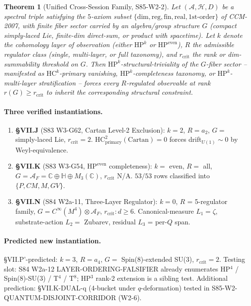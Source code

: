 \documentclass{article}
\newtheorem{theorem}{Theorem}
\begin{document}
\begin{theorem}[Unified Cross-Session Family, S85-W2-2]
Let $(\mathcal{A}, \mathcal{H}, D)$ be a spectral triple satisfying the $5$-axiom
subset $\{\text{dim}, \text{reg}, \text{fin}, \text{real}, \text{1st-order}\}$ of
CCM-2007, with finite fiber sector carried by an algebra/group structure $G$
(compact simply-laced Lie, finite-dim direct-sum, or product with spacetime).
Let $k$ denote the cohomology layer of observation (either $\mathrm{HP}^k$ or
$\mathrm{HP}^{\text{even}}$), $R$ the admissible regulator class (single,
multi-layer, or full taxonomy), and $r_{\text{crit}}$ the rank or
dim-summability threshold on $G$.
Then $\mathrm{HP}^k$-structural-triviality of the $G$-fiber sector --
manifested as $\mathrm{HC}^k$-primary vanishing, $\mathrm{HP}^k$-completeness
taxonomy, or $\mathrm{HP}^k$-multi-layer stratification -- forces every
$R$-regulated observable at rank $r(G) \geq r_{\text{crit}}$ to inherit the
corresponding structural constraint.
\end{theorem}

\paragraph{Three verified instantiations.}
\begin{enumerate}
\item \textbf{\S VII.J} (S83 W3-G62, Cartan Level-2 Exclusion):
      $k=2$, $R = a_2$, $G = $ simply-laced Lie, $r_{\text{crit}}=2$.
      $\mathrm{HC}^2_{\text{primary}}(\text{Cartan}) = 0$ forces
      drift$_{U(1)} \sim 0$ by Weyl-equivalence.
\item \textbf{\S VII.K} (S83 W3-G54, $\mathrm{HP}^{\text{even}}$ completeness):
      $k = $ even, $R = $ all, $G = \mathcal{A}_F = \mathbb{C} \oplus \mathbb{H}
      \oplus M_3(\mathbb{C})$, $r_{\text{crit}}$ N/A.
      $53/53$ rows classified into $\{P, CM, M, GV\}$.
\item \textbf{\S VII.N} (S84 W2a-11, Three-Layer Regulator):
      $k = 0$, $R$ = 5-regulator family, $G = C^\infty(M^4) \otimes
      \mathcal{A}_F$, $r_{\text{crit}}: d \geq 6$.
      Canonical-measure $L_1 = \zeta$, substrate-action $L_2 = $ Zubarev,
      residual $L_3$ = per-$Q$ span.
\end{enumerate}

\paragraph{Predicted new instantiation.}
\S VII.P'-predicted: $k=3$, $R = a_4$, $G = $ Spin(8)-extended SU(3),
$r_{\text{crit}} = 2$.  Testing slot: S84 W2a-12 LAYER-ORDERING-FALSIFIER
already enumerates HP$^4$ / Spin(8)-SU(3) / T$^4$ / T$^8$; HP$^3$ rank-2
extension is a sibling test.  Additional prediction: \S VII.K-DUAL-q
(4-bucket under $q$-deformation) tested in S85-W2-QUANTUM-DISJOINT-CORRIDOR
(W2-6).
\end{document}

